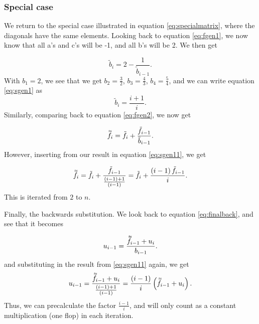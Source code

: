 \documentclass{emulateapj}
\newcommand{\dbtilde}[1]{\accentset{\approx}{#1}}
\begin{document}
\subsubsection{Special case}
We return to the special case illustrated in equation \ref{eq:specialmatrix}, where the diagonals have the same elements. Looking back to equation \ref{eq:fgen1}, we now know that all a's and c's will be -1, and all b's will be 2. We then get

\begin{equation} \label{eq:sgen1}
    \tilde{b}_i = 2 - \frac{1}{\tilde{b}_{i-1}}.
\end{equation}
With $b_1 = 2$, we see that we get $b_2 = \frac{3}{2}$, $b_3 = \frac{4}{3}$, $b_4 = \frac{5}{4}$, and we can write equation \ref{eq:sgen1} as
\begin{equation} \label{eq:sgen11}
    \tilde{b}_i = \frac{i+1}{i}.
\end{equation}
Similarly, comparing back to equation \ref{eq:fgen2}, we now get

\begin{equation} \label{eq:sgen1}
    \dbtilde{f_{i}} = \tilde{f_{i}} + \frac{\tilde{f}_{i-1}}{\tilde{b}_{i-1}}.
\end{equation}
However, inserting from our result in equation \ref{eq:sgen11}, we get

\begin{equation} \label{eq:sgen22}
    \dbtilde{f_{i}} = \tilde{f_{i}} + \frac{ \tilde{f}_{i-1}}{\frac{\left(i-1\right)+1}{\left(i-1\right)}} = \tilde{f_{i}} + \frac{\left(i-1\right)\tilde{f}_{i-1}}{i}.
\end{equation}
This is iterated from $2$ to $n$.

Finally, the backwards substitution. We look back to equation \ref{eq:finalback}, and see that it becomes

\begin{equation} \label{eq:sgenback}
    u_{i-1} =  \frac{\dbtilde{f}_{i-1} + u_i }{b_{i-1}}.
\end{equation}
and substituting in the result from \ref{eq:sgen11} again, we get
\begin{equation} \label{eq:sgenback}
    u_{i-1} =  \frac{\dbtilde{f}_{i-1} + u_i }{ \frac{\left(i-1\right)+1}{\left(i-1\right)} } = \frac{\left(i-1\right)}{i}\left(\dbtilde{f}_{i-1} + u_i\right) .
\end{equation}
Thus, we can precalculate the factor $\frac{i-1}{i}$, and will only count as a constant multiplication (one flop) in each iteration.
\end{document}
